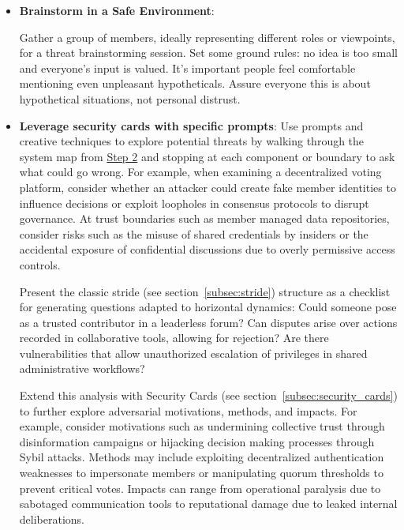 \begin{itemize}

    \item \textbf{Brainstorm in a Safe Environment}:
    
    Gather a group of members, ideally representing different roles or viewpoints,
    for a threat brainstorming session. Set some ground rules: no idea is
    too small and everyone's input is valued. It's important
    people feel comfortable mentioning even unpleasant hypotheticals.
    Assure everyone this is about hypothetical situations,
    not personal distrust.

    \item \textbf{Leverage security cards with specific prompts}: Use
    prompts and creative techniques to explore potential threats by walking through
    the system map from \hyperref[subsec:Step2]{Step 2} and stopping at each
    component or boundary to ask what could go wrong. For example, when examining a
    decentralized voting platform, consider whether an attacker could create fake
    member identities to influence decisions or exploit loopholes in consensus
    protocols to disrupt governance. At trust boundaries such as member managed data
    repositories, consider risks such as the misuse of shared credentials by
    insiders or the accidental exposure of confidential discussions due to overly
    permissive access controls.

    Present the classic \gls{stride} (see section~\ref{subsec:stride}) structure as a checklist for generating
    questions adapted to horizontal dynamics: Could someone pose as a trusted
    contributor in a leaderless forum? Can disputes arise over actions recorded in
    collaborative tools, allowing for rejection? Are there vulnerabilities that
    allow unauthorized escalation of privileges in shared administrative workflows?

    Extend this analysis with Security Cards (see section~\ref{subsec:security_cards}) to further explore
    adversarial motivations, methods, and impacts. For example, consider motivations such as
    undermining collective trust through disinformation campaigns or hijacking
    decision making processes through Sybil attacks. Methods may include exploiting
    decentralized authentication weaknesses to impersonate members or manipulating
    quorum thresholds to prevent critical votes. Impacts can range from operational
    paralysis due to sabotaged communication tools to reputational damage due to
    leaked internal deliberations. 


\end{itemize}

